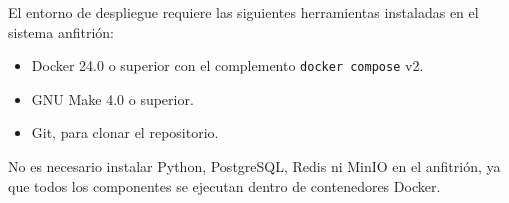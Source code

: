 El entorno de despliegue requiere las siguientes herramientas instaladas
en el sistema anfitrión:

\begin{itemize}
  \item Docker 24.0 o superior con el complemento \texttt{docker compose}
        v2.
  \item GNU Make 4.0 o superior.
  \item Git, para clonar el repositorio.
\end{itemize}

No es necesario instalar Python, PostgreSQL, Redis ni MinIO en el
anfitrión, ya que todos los componentes se ejecutan dentro de
contenedores Docker.
